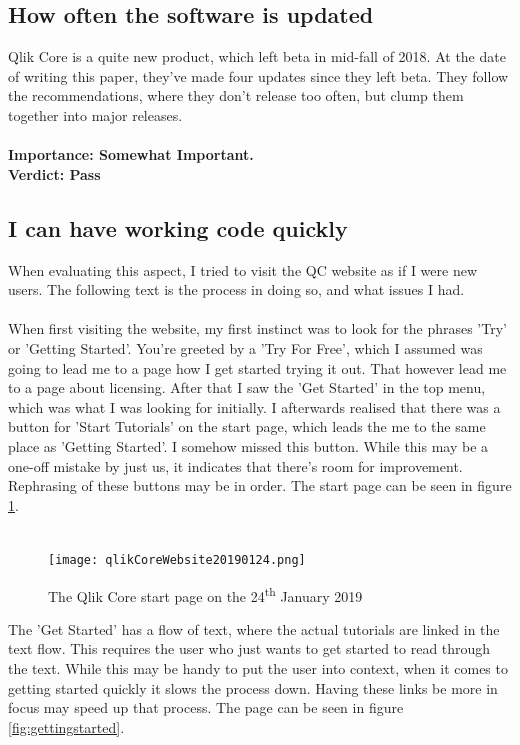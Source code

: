 \documentclass{cslthse-msc}
\begin{document}
    \subsection{How often the software is updated}
    Qlik Core is a quite new product, which left beta in mid-fall of 2018. At the date of writing this paper, they've made four updates since they left beta. They follow the recommendations, where they don't release too often, but clump them together into major releases.\\ \\
    \textbf{Importance: Somewhat Important.}\\
    \textbf{Verdict: Pass}
    \subsection{I can have working code quickly}\label{workincode}
    When evaluating this aspect, I tried to visit the QC website as if I were new users. The following text is the process in doing so, and what issues I had.\\ \\
    When first visiting the website, my first instinct was to look for the phrases 'Try' or 'Getting Started'. You're greeted by a 'Try For Free', which I assumed was going to lead me to a page how I get started trying it out. That however lead me to a page about licensing. After that I saw the 'Get Started' in the top menu, which was what I was looking for initially. I afterwards realised that there was a button for 'Start Tutorials' on the start page, which leads the me to the same place as 'Getting Started'. I somehow missed this button. While this may be a one-off mistake by just us, it indicates that there's room for improvement. Rephrasing of these buttons may be in order. The start page can be seen in figure \ref{fig:startpage}. \\ \\
    \begin{figure}[H]
        \centering
        \texttt{[image: qlikCoreWebsite20190124.png]}
        \caption{The Qlik Core start page on the 24\textsuperscript{th} January 2019}
        \label{fig:startpage}
    \end{figure}
    The 'Get Started' has a flow of text, where the actual tutorials are linked in the text flow. This requires the user who just wants to get started to read through the text. While this may be handy to put the user into context, when it comes to getting started quickly it slows the process down. Having these links be more in focus may speed up that process. The page can be seen in figure \ref{fig:gettingstarted}.
\end{document}
